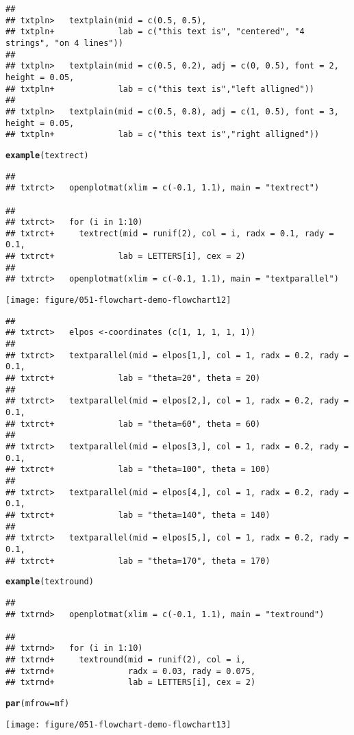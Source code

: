 \documentclass{article}\usepackage{graphicx, color}
\makeatletter
\def\maxwidth{ %
  \ifdim\Gin@nat@width>\linewidth
    \linewidth
  \else
    \Gin@nat@width
  \fi
}
\newcommand{\hlfunctioncall}[1]{\textcolor[rgb]{0.501960784313725,0,0.329411764705882}{\textbf{#1}}}%
\newenvironment{kframe}{%
 \def\at@end@of@kframe{}%
 \ifinner\ifhmode%
  \def\at@end@of@kframe{\end{minipage}}%
  \begin{minipage}{\columnwidth}%
 \fi\fi%
 \def\FrameCommand##1{\hskip\@totalleftmargin \hskip-\fboxsep
 \colorbox{shadecolor}{##1}\hskip-\fboxsep
     \hskip-\linewidth \hskip-\@totalleftmargin \hskip\columnwidth}%
 \MakeFramed {\advance\hsize-\width
   \@totalleftmargin\z@ \linewidth\hsize
   \@setminipage}}%
 {\par\unskip\endMakeFramed%
 \at@end@of@kframe}
\newenvironment{knitrout}{}{} %
\makeatother
\begin{document}
\begin{knitrout}
\begin{kframe}
\begin{verbatim}
## 
## txtpln>   textplain(mid = c(0.5, 0.5), 
## txtpln+             lab = c("this text is", "centered", "4 strings", "on 4 lines"))
## 
## txtpln>   textplain(mid = c(0.5, 0.2), adj = c(0, 0.5), font = 2, height = 0.05,
## txtpln+             lab = c("this text is","left alligned"))
## 
## txtpln>   textplain(mid = c(0.5, 0.8), adj = c(1, 0.5), font = 3, height = 0.05, 
## txtpln+             lab = c("this text is","right alligned"))
\end{verbatim}
\begin{alltt}
\hlfunctioncall{example}(textrect)
\end{alltt}
\begin{verbatim}
## 
## txtrct>   openplotmat(xlim = c(-0.1, 1.1), main = "textrect")

## 
## txtrct>   for (i in 1:10) 
## txtrct+     textrect(mid = runif(2), col = i, radx = 0.1, rady = 0.1,
## txtrct+             lab = LETTERS[i], cex = 2)
## 
## txtrct>   openplotmat(xlim = c(-0.1, 1.1), main = "textparallel")
\end{verbatim}
\end{kframe}
\texttt{[image: figure/051-flowchart-demo-flowchart12]} 
\begin{kframe}\begin{verbatim}
## 
## txtrct>   elpos <-coordinates (c(1, 1, 1, 1, 1))
## 
## txtrct>   textparallel(mid = elpos[1,], col = 1, radx = 0.2, rady = 0.1,
## txtrct+             lab = "theta=20", theta = 20)
## 
## txtrct>   textparallel(mid = elpos[2,], col = 1, radx = 0.2, rady = 0.1,
## txtrct+             lab = "theta=60", theta = 60)
## 
## txtrct>   textparallel(mid = elpos[3,], col = 1, radx = 0.2, rady = 0.1,
## txtrct+             lab = "theta=100", theta = 100)
## 
## txtrct>   textparallel(mid = elpos[4,], col = 1, radx = 0.2, rady = 0.1,
## txtrct+             lab = "theta=140", theta = 140)
## 
## txtrct>   textparallel(mid = elpos[5,], col = 1, radx = 0.2, rady = 0.1,
## txtrct+             lab = "theta=170", theta = 170)
\end{verbatim}
\begin{alltt}
\hlfunctioncall{example}(textround)
\end{alltt}
\begin{verbatim}
## 
## txtrnd>   openplotmat(xlim = c(-0.1, 1.1), main = "textround")

## 
## txtrnd>   for (i in 1:10) 
## txtrnd+     textround(mid = runif(2), col = i, 
## txtrnd+               radx = 0.03, rady = 0.075,
## txtrnd+               lab = LETTERS[i], cex = 2)
\end{verbatim}
\begin{alltt}


\hlfunctioncall{par}(mfrow = mf)
\end{alltt}
\end{kframe}
\texttt{[image: figure/051-flowchart-demo-flowchart13]} 

\end{knitrout}
\end{document}
